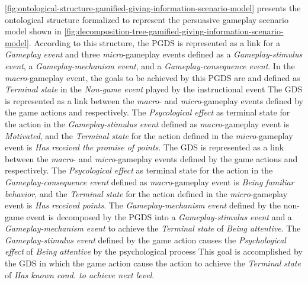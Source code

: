 \autoref{fig:ontological-structure-gamified-giving-information-scenario-model} presents the ontological structure formalized to represent the persuasive gameplay scenario model shown in \autoref{fig:decomposition-tree-gamified-giving-information-scenario-model}. According to this structure, the PGDS  is represented as a link for a \emph{Gameplay event} and three \emph{micro}-gameplay events defined as a \emph{Gameplay-stimulus event}, a \emph{Gameplay-mechanism event}, and a \emph{Gameplay-consequence event}. In the \emph{macro}-gameplay event, the goals to be achieved by this PGDS are  and  defined as \emph{Terminal state} in the \emph{Non-game event} played by the instructional event 
The GDS  is represented as a link between the \emph{macro}- and \emph{micro}-gameplay events defined by the game actions  and  respectively. The \emph{Psycological effect} as terminal state for the action  in the \emph{Gameplay-stimulus event} defined as \emph{macro}-gameplay event is \emph{Motivated}, and the \emph{Terminal state} for the action  defined in the \emph{micro}-gameplay event is \emph{Has received the promise of points}. 
The GDS  is represented as a link between the \emph{macro}- and \emph{micro}-gameplay events defined by the game actions  and  respectively. The \emph{Psycological effect} as terminal state for the action  in the \emph{Gameplay-consequence event} defined as \emph{macro}-gameplay event is \emph{Being familiar behavior}, and the \emph{Terminal state} for the action  defined in the \emph{micro}-gameplay event is \emph{Has received points}. 
The \emph{Gameplay-mechanism event} defined by the non-game event  is decomposed by the PGDS  into a \emph{Gameplay-stimulus event} and a \emph{Gameplay-mechanism event} to achieve the \emph{Terminal state} of \emph{Being attentive}. 
The \emph{Gameplay-stimulus event} defined by the game action  causes the \emph{Psychological effect} of \emph{Being attentive} by the psychological process 
This goal is accomplished by the GDS  in which the game action  cause the action  to achieve the \emph{Terminal state} of \emph{Has known cond. to achieve next level}.

